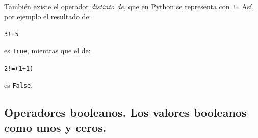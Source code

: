 \documentclass[10pt,a4paper]{article}\usepackage[]{graphicx}\usepackage[]{color}
\makeatletter
\newcommand{\hlnum}[1]{\textcolor[rgb]{0.686,0.059,0.569}{#1}}%
\newcommand{\hlopt}[1]{\textcolor[rgb]{0,0,0}{#1}}%
\newcommand{\hlstd}[1]{\textcolor[rgb]{0.345,0.345,0.345}{#1}}%
\newenvironment{kframe}{%
 \def\at@end@of@kframe{}%
 \ifinner\ifhmode%
  \def\at@end@of@kframe{\end{minipage}}%
  \begin{minipage}{\columnwidth}%
 \fi\fi%
 \def\FrameCommand##1{\hskip\@totalleftmargin \hskip-\fboxsep
 \colorbox{shadecolor}{##1}\hskip-\fboxsep
     \hskip-\linewidth \hskip-\@totalleftmargin \hskip\columnwidth}%
 \MakeFramed {\advance\hsize-\width
   \@totalleftmargin\z@ \linewidth\hsize
   \@setminipage}}%
 {\par\unskip\endMakeFramed%
 \at@end@of@kframe}
\newenvironment{knitrout}{}{} %
\makeatother
\begin{document}
También existe el operador {\em distinto de}, que en Python se representa con {\tt !=} Así, por ejemplo el resultado de:
\begin{knitrout}
\color{fgcolor}\begin{kframe}
\begin{alltt}
\hlnum{3} \hlopt{!=} \hlnum{5}
\end{alltt}
\end{kframe}
\end{knitrout}
es {\tt True}, mientras que el de:
\begin{knitrout}
\color{fgcolor}\begin{kframe}
\begin{alltt}
\hlnum{2} \hlopt{!=} \hlstd{(}\hlnum{1} \hlopt{+} \hlnum{1}\hlstd{)}
\end{alltt}
\end{kframe}
\end{knitrout}
es {\tt False}.

\subsection{Operadores booleanos. Los valores booleanos como unos y ceros.}
\label{tut02:subsec:BooleanosComoUnosCeros}
\end{document}
